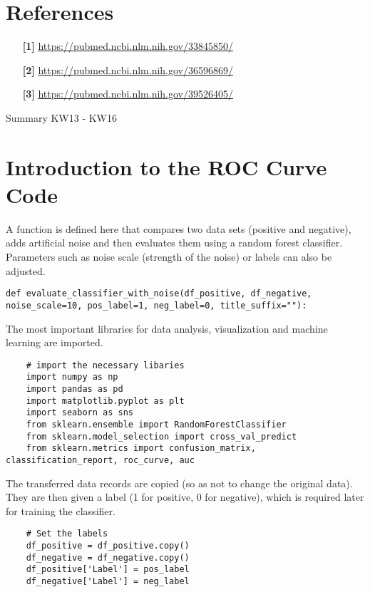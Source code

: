 \documentclass{article}
\begin{document}
\begin{large}
\begin{large}
\begin{large}
\section{References}
\begin{itemize}
    \item[\textbf{[1]}] \url{https://pubmed.ncbi.nlm.nih.gov/33845850/} \par
    \item[\textbf{[2]}] \url{https://pubmed.ncbi.nlm.nih.gov/36596869/} \par
    \item[\textbf{[3]}] \url{https://pubmed.ncbi.nlm.nih.gov/39526405/} \par
\end{itemize}

Summary KW13 - KW16

\section{Introduction to the ROC Curve Code}

A function is defined here that compares two data sets (positive and negative), adds artificial noise and then evaluates them using a random forest classifier. Parameters such as noise scale (strength of the noise) or labels can also be adjusted.

\begin{lstlisting}
def evaluate_classifier_with_noise(df_positive, df_negative, noise_scale=10, pos_label=1, neg_label=0, title_suffix=""):
\end{lstlisting}\par
\vspace{1em}

The most important libraries for data analysis, visualization and machine learning are imported.
\begin{lstlisting}
    # import the necessary libaries
    import numpy as np
    import pandas as pd
    import matplotlib.pyplot as plt
    import seaborn as sns
    from sklearn.ensemble import RandomForestClassifier
    from sklearn.model_selection import cross_val_predict
    from sklearn.metrics import confusion_matrix, classification_report, roc_curve, auc
\end{lstlisting}\par
\vspace{1em}

The transferred data records are copied (so as not to change the original data). They are then given a label (1 for positive, 0 for negative), which is required later for training the classifier.
\begin{lstlisting}
    # Set the labels 
    df_positive = df_positive.copy()
    df_negative = df_negative.copy()
    df_positive['Label'] = pos_label
    df_negative['Label'] = neg_label
\end{lstlisting}\par
\vspace{1em}


\end{large}
\end{large}
\end{large}
\end{document}
